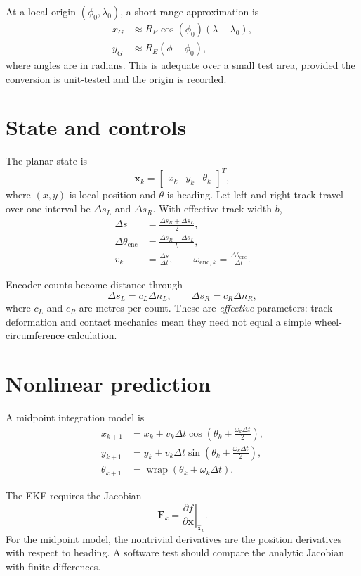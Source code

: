 \documentclass[11pt,oneside]{book}
\newcommand{\vect}[1]{\bm{#1}}
\begin{document}
At a local origin $(\phi_0,\lambda_0)$, a short-range approximation is
\begin{align}
x_G &\approx R_E\cos(\phi_0)(\lambda-\lambda_0),\\
y_G &\approx R_E(\phi-\phi_0),
\end{align}
where angles are in radians. This is adequate over a small test area, provided
the conversion is unit-tested and the origin is recorded.

\section{State and controls}

The planar state is
\[
\vect{x}_k =
\begin{bmatrix}
x_k & y_k & \theta_k
\end{bmatrix}^{T},
\]
where $(x,y)$ is local position and $\theta$ is heading. Let left and right
track travel over one interval be $\Delta s_L$ and $\Delta s_R$. With effective
track width $b$,
\begin{align}
\Delta s &= \frac{\Delta s_R+\Delta s_L}{2},\\
\Delta\theta_{\mathrm{enc}} &= \frac{\Delta s_R-\Delta s_L}{b},\\
v_k &= \frac{\Delta s}{\Delta t},\qquad
\omega_{\mathrm{enc},k}=\frac{\Delta\theta_{\mathrm{enc}}}{\Delta t}.
\end{align}

Encoder counts become distance through
\[
\Delta s_L=c_L\Delta n_L,\qquad
\Delta s_R=c_R\Delta n_R,
\]
where $c_L$ and $c_R$ are metres per count. These are \emph{effective}
parameters: track deformation and contact mechanics mean they need not equal a
simple wheel-circumference calculation.

\section{Nonlinear prediction}

A midpoint integration model is
\begin{align}
x_{k+1} &= x_k + v_k\Delta t
\cos\left(\theta_k+\frac{\omega_k\Delta t}{2}\right),\\
y_{k+1} &= y_k + v_k\Delta t
\sin\left(\theta_k+\frac{\omega_k\Delta t}{2}\right),\\
\theta_{k+1} &= \operatorname{wrap}(\theta_k+\omega_k\Delta t).
\end{align}

The EKF requires the Jacobian
\[
\vect{F}_k=\left.\frac{\partial f}{\partial\vect{x}}\right|_{\hat{\vect{x}}_k}.
\]
For the midpoint model, the nontrivial derivatives are the position
derivatives with respect to heading. A software test should compare the
analytic Jacobian with finite differences.
\end{document}
